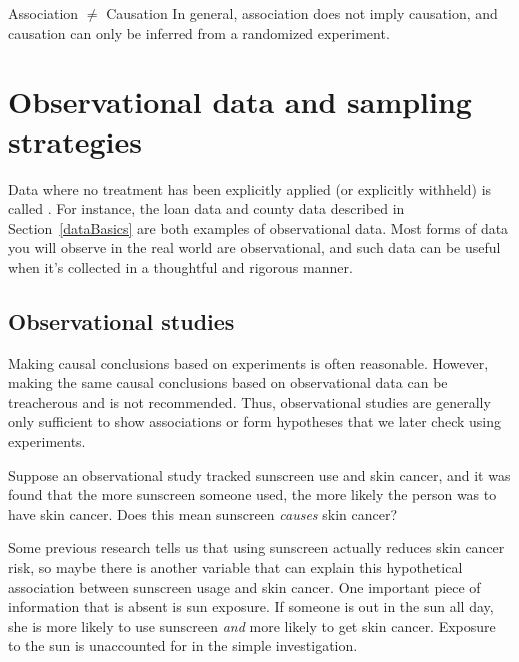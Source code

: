 \begin{onebox}{Association $\neq$ Causation}
  In general, association does not imply causation,
  and causation can only be inferred from a randomized experiment.
\end{onebox}


\section{Observational data and sampling strategies}
\label{section_obs_data_sampling}

Data where no treatment has been explicitly applied
(or explicitly withheld) is called .
For instance, the loan data and county data described in
Section~\ref{dataBasics}
are both examples of observational data.
Most forms of data you will observe in the real world
are observational,
and such data can be useful when it's collected in
a thoughtful and rigorous manner.


\subsection{Observational studies}

Making causal conclusions based on experiments is often reasonable.
However, making the same causal conclusions based on observational
data can be treacherous and is not recommended.
Thus, observational studies are generally only sufficient
to show associations or form hypotheses that we later check
using experiments.

\begin{exercisewrap}
\begin{nexercise}\label{sunscreenLurkingExample}%
Suppose an observational study tracked sunscreen use and skin cancer, and it was found that the more sunscreen someone used, the more likely the person was to have skin cancer. Does this mean sunscreen \emph{causes} skin cancer?\footnotemark
\end{nexercise}
\end{exercisewrap}

Some previous research tells us that using sunscreen actually reduces skin cancer risk, so maybe there is another variable that can explain this hypothetical association between sunscreen usage and skin cancer. One important piece of information that is absent is sun exposure. If someone is out in the sun all day, she is more likely to use sunscreen \emph{and} more likely to get skin cancer. Exposure to the sun is unaccounted for in the simple investigation.
\begin{center}
\end{center}

